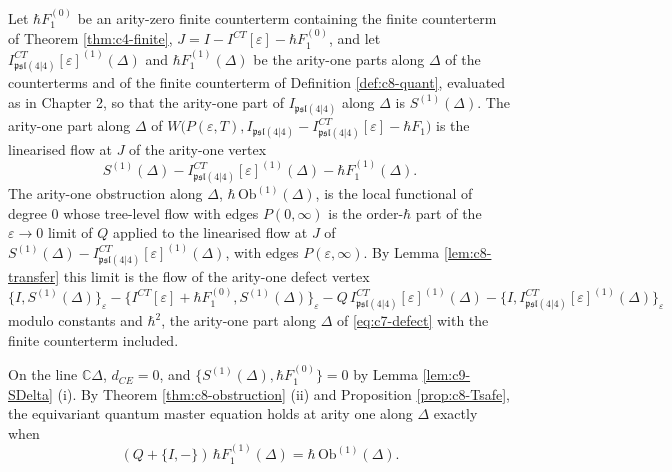 \begin{definition}
\label{def:c9-data}
Let $\hbar F_1^{(0)}$ be an arity-zero finite counterterm containing the finite counterterm of Theorem \ref{thm:c4-finite}, $J=I-I^{CT}[\varepsilon]-\hbar F_1^{(0)}$, and let $I^{CT}_{\mathfrak{psl}(4|4)}[\varepsilon]^{(1)}(\Delta)$ and $\hbar F_1^{(1)}(\Delta)$ be the arity-one parts along $\Delta$ of the counterterms and of the finite counterterm of Definition \ref{def:c8-quant}, evaluated as in Chapter 2, so that the arity-one part of $I_{\mathfrak{psl}(4|4)}$ along $\Delta$ is $S^{(1)}(\Delta)$. The arity-one part along $\Delta$ of $W\big(P(\varepsilon,T),I_{\mathfrak{psl}(4|4)}-I^{CT}_{\mathfrak{psl}(4|4)}[\varepsilon]-\hbar F_1\big)$ is the linearised flow at $J$ of the arity-one vertex
\[
S^{(1)}(\Delta)-I^{CT}_{\mathfrak{psl}(4|4)}[\varepsilon]^{(1)}(\Delta)-\hbar F_1^{(1)}(\Delta).
\]
The arity-one obstruction along $\Delta$, $\hbar\,\mathrm{Ob}^{(1)}(\Delta)$, is the local functional of degree $0$ whose tree-level flow with edges $P(0,\infty)$ is the order-$\hbar$ part of the $\varepsilon\to0$ limit of $Q$ applied to the linearised flow at $J$ of $S^{(1)}(\Delta)-I^{CT}_{\mathfrak{psl}(4|4)}[\varepsilon]^{(1)}(\Delta)$, with edges $P(\varepsilon,\infty)$. By Lemma \ref{lem:c8-transfer} this limit is the flow of the arity-one defect vertex
\[
\{I,S^{(1)}(\Delta)\}_\varepsilon-\big\{I^{CT}[\varepsilon]+\hbar F_1^{(0)},S^{(1)}(\Delta)\big\}_\varepsilon-Q\,I^{CT}_{\mathfrak{psl}(4|4)}[\varepsilon]^{(1)}(\Delta)-\big\{I,I^{CT}_{\mathfrak{psl}(4|4)}[\varepsilon]^{(1)}(\Delta)\big\}_\varepsilon
\]
modulo constants and $\hbar^2$, the arity-one part along $\Delta$ of \eqref{eq:c7-defect} with the finite counterterm included.
\end{definition}

On the line $\mathbb C\Delta$, $d_{CE}=0$, and $\{S^{(1)}(\Delta),\hbar F_1^{(0)}\}=0$ by Lemma \ref{lem:c9-SDelta} (i). By Theorem \ref{thm:c8-obstruction} (ii) and Proposition \ref{prop:c8-Tsafe}, the equivariant quantum master equation holds at arity one along $\Delta$ exactly when
\begin{equation}
(Q+\{I,-\})\,\hbar F_1^{(1)}(\Delta)=\hbar\,\mathrm{Ob}^{(1)}(\Delta).
\label{eq:c9-arity1}
\end{equation}

